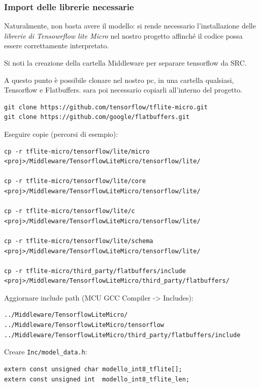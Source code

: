 \subsubsection{Import delle librerie necessarie}
Naturalmente, non basta avere il modello: si rende necessario l'installazione delle \textit{librerie di Tensowrflow lite Micro} nel nostro progetto affinché il codice possa essere correttamente interpretato.

Si noti la creazione della cartella Middleware per separare tensorflow da SRC.

A questo punto è possibile clonare nel nostro pc, in una cartella qualsiasi, Tensorflow e Flatbuffers. sara poi necessario copiarli all'interno del progetto.
\begin{verbatim}
git clone https://github.com/tensorflow/tflite-micro.git
git clone https://github.com/google/flatbuffers.git
\end{verbatim}
Eseguire copie (percorsi di esempio):
\begin{verbatim}
cp -r tflite-micro/tensorflow/lite/micro    
<proj>/Middleware/TensorflowLiteMicro/tensorflow/lite/

cp -r tflite-micro/tensorflow/lite/core 
<proj>/Middleware/TensorflowLiteMicro/tensorflow/lite/

cp -r tflite-micro/tensorflow/lite/c
<proj>/Middleware/TensorflowLiteMicro/tensorflow/lite/

cp -r tflite-micro/tensorflow/lite/schema
<proj>/Middleware/TensorflowLiteMicro/tensorflow/lite/

cp -r tflite-micro/third_party/flatbuffers/include
<proj>/Middleware/TensorflowLiteMicro/third_party/flatbuffers/
\end{verbatim}
Aggiornare include path (MCU GCC Compiler -> Includes):
\begin{verbatim}
../Middleware/TensorflowLiteMicro/
../Middleware/TensorflowLiteMicro/tensorflow
../Middleware/TensorflowLiteMicro/third_party/flatbuffers/include
\end{verbatim}
Creare \texttt{Inc/model\_data.h}:
\begin{verbatim}
extern const unsigned char modello_int8_tflite[];
extern const unsigned int  modello_int8_tflite_len;
\end{verbatim}


